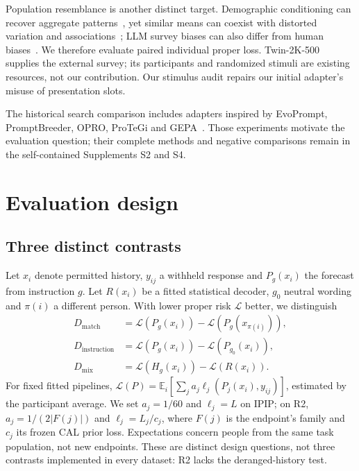 \documentclass[11pt]{article}
\begin{document}
Population resemblance is another distinct target. Demographic conditioning can recover aggregate patterns~\citep{argyle2023samples}, yet similar means can coexist with distorted variation and associations~\citep{bisbee2024synthetic}; LLM survey biases can also differ from human biases~\citep{tjuatja2024biases}. We therefore evaluate paired individual proper loss. Twin-2K-500~\citep{toubia2025twin} supplies the external survey; its participants and randomized stimuli are existing resources, not our contribution. Our stimulus audit repairs our initial adapter's misuse of presentation slots.

The historical search comparison includes adapters inspired by EvoPrompt, PromptBreeder, OPRO, ProTeGi and GEPA~\citep{guo2024connecting,fernando2024promptbreeder,yang2024opro,pryzant2023protegi,agrawal2025gepa}. Those experiments motivate the evaluation question; their complete methods and negative comparisons remain in the self-contained Supplements S2 and S4.

\section{Evaluation design}
\subsection{Three distinct contrasts}
Let $x_i$ denote permitted history, $y_{ij}$ a withheld response and $P_g(x_i)$ the forecast from instruction $g$. Let $R(x_i)$ be a fitted statistical decoder, $g_0$ neutral wording and $\pi(i)$ a different person. With lower proper risk $\mathcal L$ better, we distinguish
\begin{align}
D_{\mathrm{match}}&=\mathcal L(P_g(x_i))-\mathcal L(P_g(x_{\pi(i)})),\\
D_{\mathrm{instruction}}&=\mathcal L(P_g(x_i))-\mathcal L(P_{g_0}(x_i)),\\
D_{\mathrm{mix}}&=\mathcal L(H_g(x_i))-\mathcal L(R(x_i)).
\end{align}
For fixed fitted pipelines, $\mathcal L(P)=\mathbb E_i[\sum_j a_j\ell_j(P_j(x_i),y_{ij})]$, estimated by the participant average. We set $a_j=1/60$ and $\ell_j=L$ on IPIP; on R2, $a_j=1/(2|F(j)|)$ and $\ell_j=L_j/c_j$, where $F(j)$ is the endpoint's family and $c_j$ its frozen CAL prior loss. Expectations concern people from the same task population, not new endpoints. These are distinct design questions, not three contrasts implemented in every dataset: R2 lacks the deranged-history test.
\end{document}
